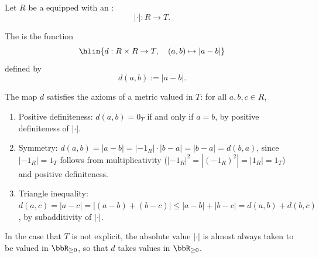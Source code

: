 \begin{definition} \label{definition:metric_induced_by_an_absolute_value_on_a_commutative_ring}
    Let $R$ be a  equipped with an :
    $$|\cdot| : R \to T.$$

    The  is the function
    $$\hlin{d : R \times R \to T, \quad (a,b) \mapsto |a - b|}$$
    defined by
    $$d(a,b) := |a - b|.$$

    The map $d$ satisfies the axioms of a metric valued in $T$: for all $a,b,c \in R$,
    \begin{enumerate}
        \item Positive definiteness: $d(a,b) = 0_T$ if and only if $a = b$, by positive definiteness of $|\cdot|$.
        \item Symmetry: $d(a,b) = |a - b| = |-1_R| \cdot |b - a| = |b - a| = d(b,a)$, since $|-1_R| = 1_T$ follows from multiplicativity ($|-1_R|^2 = |(-1_R)^2| = |1_R| = 1_T$) and positive definiteness.
        \item Triangle inequality: $d(a,c) = |a - c| = |(a - b) + (b - c)| \leq |a - b| + |b - c| = d(a,b) + d(b,c)$, by subadditivity of $|\cdot|$.
    \end{enumerate}

    In the case that $T$ is not explicit, the absolute value $|\cdot|$ is almost always taken to be valued in $\bbR_{\geq 0}$, so that $d$ takes values in $\bbR_{\geq 0}$.

\end{definition}
